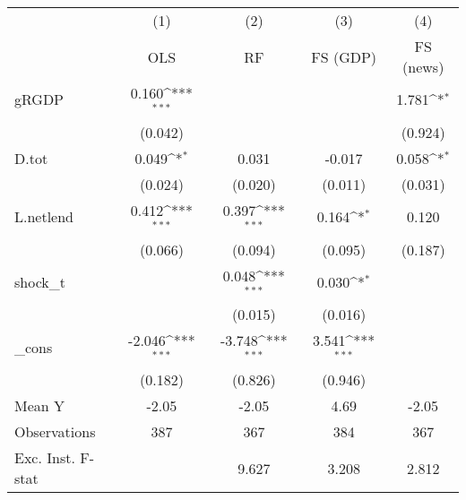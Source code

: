 {
\def\sym#1{\ifmmode^{#1}\else\(^{#1}\)\fi}
\begin{tabular}{l*{4}{c}}
\toprule
            &\multicolumn{1}{c}{(1)}&\multicolumn{1}{c}{(2)}&\multicolumn{1}{c}{(3)}&\multicolumn{1}{c}{(4)}\\
            &\multicolumn{1}{c}{OLS}&\multicolumn{1}{c}{RF}&\multicolumn{1}{c}{FS (GDP)}&\multicolumn{1}{c}{FS (news)}\\
\midrule
gRGDP       &       0.160\sym{***}&                     &                     &       1.781\sym{*}  \\
            &     (0.042)         &                     &                     &     (0.924)         \\
\addlinespace
D.tot       &       0.049\sym{*}  &       0.031         &      -0.017         &       0.058\sym{*}  \\
            &     (0.024)         &     (0.020)         &     (0.011)         &     (0.031)         \\
\addlinespace
L.netlend   &       0.412\sym{***}&       0.397\sym{***}&       0.164\sym{*}  &       0.120         \\
            &     (0.066)         &     (0.094)         &     (0.095)         &     (0.187)         \\
\addlinespace
shock\_t     &                     &       0.048\sym{***}&       0.030\sym{*}  &                     \\
            &                     &     (0.015)         &     (0.016)         &                     \\
\addlinespace
\_cons      &      -2.046\sym{***}&      -3.748\sym{***}&       3.541\sym{***}&                     \\
            &     (0.182)         &     (0.826)         &     (0.946)         &                     \\
\midrule
Mean Y      &       -2.05         &       -2.05         &        4.69         &       -2.05         \\
Observations&         387         &         367         &         384         &         367         \\
Exc. Inst. F-stat&                     &       9.627         &       3.208         &       2.812         \\
\bottomrule
\end{tabular}
}
